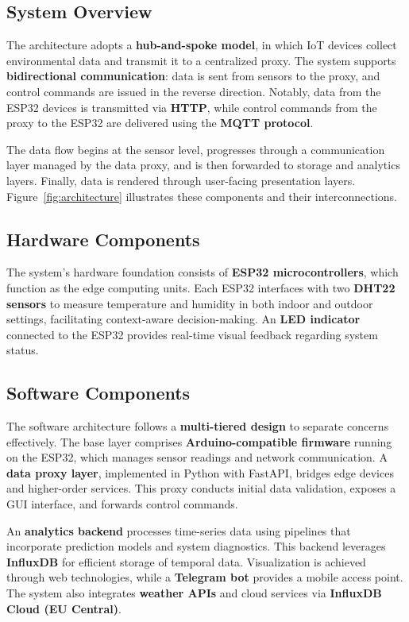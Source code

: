 \documentclass[journal]{IEEEtran}
\begin{document}
\subsection{System Overview}

The architecture adopts a \textbf{hub-and-spoke model}, in which IoT devices collect environmental data and transmit it to a centralized proxy. The system supports \textbf{bidirectional communication}: data is sent from sensors to the proxy, and control commands are issued in the reverse direction. Notably, data from the ESP32 devices is transmitted via \textbf{HTTP}, while control commands from the proxy to the ESP32 are delivered using the \textbf{MQTT protocol}.

The data flow begins at the sensor level, progresses through a communication layer managed by the data proxy, and is then forwarded to storage and analytics layers. Finally, data is rendered through user-facing presentation layers. Figure~\ref{fig:architecture} illustrates these components and their interconnections.

\subsection{Hardware Components}

The system's hardware foundation consists of \textbf{ESP32 microcontrollers}, which function as the edge computing units. Each ESP32 interfaces with two \textbf{DHT22 sensors} to measure temperature and humidity in both indoor and outdoor settings, facilitating context-aware decision-making. An \textbf{LED indicator} connected to the ESP32 provides real-time visual feedback regarding system status.

\subsection{Software Components}

The software architecture follows a \textbf{multi-tiered design} to separate concerns effectively. The base layer comprises \textbf{Arduino-compatible firmware} running on the ESP32, which manages sensor readings and network communication. A \textbf{data proxy layer}, implemented in Python with FastAPI, bridges edge devices and higher-order services. This proxy conducts initial data validation, exposes a GUI interface, and forwards control commands.

An \textbf{analytics backend} processes time-series data using pipelines that incorporate prediction models and system diagnostics. This backend leverages \textbf{InfluxDB} for efficient storage of temporal data. Visualization is achieved through web technologies, while a \textbf{Telegram bot} provides a mobile access point. The system also integrates \textbf{weather APIs} and cloud services via \textbf{InfluxDB Cloud (EU Central)}.
\end{document}

